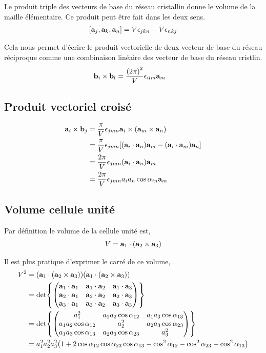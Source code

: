 \documentclass[11pt]{article}
\begin{document}
Le produit triple des vecteurs de base du réseau cristallin donne le volume de la maille élémentaire. Ce produit peut être fait dans les deux sens.
\begin{align*}
	\bqty{\vb{a}_j,\vb{a}_k,\vb{a}_n} = V \epsilon_{jkn} - V\epsilon_{nkj}
\end{align*}

Cela nous permet d'écrire le produit vectorielle de deux vecteur de base du réseau réciproque comme une combinaison linéaire des vecteur de base du réseau cristlin.
\begin{align*}
	\vb{b}_i \times \vb{b}_l &= \frac{\pqty{2\pi}^2}{V} \epsilon_{ilm} \vb{a}_m
\end{align*}

\subsection{Produit vectoriel croisé}
\begin{align*}
	\vb{a}_i \times \vb{b}_j &= \frac{\pi}{V}\epsilon_{jmn}\vb{a}_i \times\pqty{\vb{a}_m \times \vb{a}_n} \\
	&= \frac{\pi}{V}\epsilon_{jmn} \bqty{\pqty{\vb{a}_i \cdot \vb{a}_n}\vb{a}_m - \pqty{\vb{a}_i \cdot \vb{a}_m}\vb{a}_n} \\
	&= \frac{2\pi}{V}\epsilon_{jmn} \pqty{\vb{a}_i \cdot \vb{a}_n}\vb{a}_m \\
	&= \frac{2\pi}{V}\epsilon_{jmn} a_ia_n\cos\alpha_{in}\vb{a}_m
\end{align*}

\subsection{Volume cellule unité}
Par définition le volume de la cellule unité est,
\begin{align*}
	V = \vb{a}_1 \cdot \pqty{\vb{a}_2 \times \vb{a}_3}
\end{align*}

Il est plus pratique d'exprimer le carré de ce volume,
\begin{align*}
	V^2 &= \pqty{\vb{a}_1 \cdot \pqty{\vb{a}_2 \times \vb{a}_3}}\pqty{\vb{a}_1 \cdot \pqty{\vb{a}_2 \times \vb{a}_3}} \\
		&= \det{\pmqty{
		\vb{a}_1 \cdot \vb{a}_1 & \vb{a}_1 \cdot \vb{a}_2 & \vb{a}_1 \cdot \vb{a}_3 \\
		\vb{a}_2 \cdot \vb{a}_1 & \vb{a}_2 \cdot \vb{a}_2 & \vb{a}_2 \cdot \vb{a}_3 \\
		\vb{a}_3 \cdot \vb{a}_1 & \vb{a}_3 \cdot \vb{a}_2 & \vb{a}_3 \cdot \vb{a}_3
	}} \\
		&= \det{\pmqty{
		a_1^2 & a_1a_2\cos\alpha_{12} & a_1a_3\cos\alpha_{13} \\
		a_1a_2\cos\alpha_{12} & a_2^2 & a_2a_3\cos\alpha_{23} \\
		a_1a_3\cos\alpha_{13} & a_2a_3\cos\alpha_{23}  & a_3^2
	}} \\
	&= a_1^2 a_2^2 a_3^2 \pqty{1 + 2\cos\alpha_{12}\cos\alpha_{23}\cos\alpha_{13} - \cos^2\alpha_{12} - \cos^2\alpha_{23} - \cos^2\alpha_{13}}
\end{align*}
\end{document}
